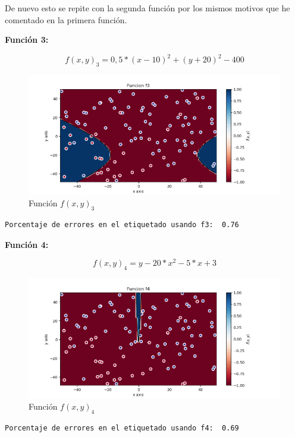 \documentclass[12pt, spanish]{article}
\begin{document}
De nuevo esto se repite con la segunda función por los mismos motivos que he comentado en la primera función.


\textbf{Función 3:} 

$$ f(x, y)_3 = 0,5*(x - 10)^2 + (y + 20)^2 - 400 $$

\begin{figure}[H]
  \centering
      \includegraphics[scale = 0.70]{ej1-3-f3.png}
 		 \caption{Función $f(x, y)_3$}
  		\label{fig:ej1-f3}

\end{figure}

\begin{lstlisting}
Porcentaje de errores en el etiquetado usando f3:  0.76
\end{lstlisting}


\textbf{Función 4:} 

$$ f(x, y)_4 = y - 20*x^2 -5*x +3  $$

\begin{figure}[H]
  \centering
      \includegraphics[scale = 0.70]{ej1-3-f4.png}
 		 \caption{Función $f(x, y)_4$}
  		\label{fig:ej1-f4}

\end{figure}

\begin{lstlisting}
Porcentaje de errores en el etiquetado usando f4:  0.69
\end{lstlisting}
\end{document}
